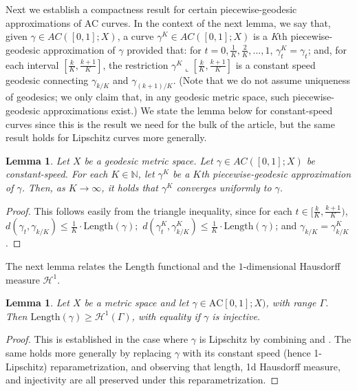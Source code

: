 \documentclass[aos, preprint]{imsart}
\theoremstyle{plain}
\newtheorem{lem}[theorem]{Lemma}
\theoremstyle{remark}
\begin{document}
\begin{appendix}
Next we establish a compactness result for certain piecewise-geodesic
approximations of AC curves. In the context of the next lemma, we say
that, given $\gamma\in AC([0,1];X)$, a curve $\gamma^{K}\in
AC([0,1];X)$ is a \emph{K}th piecewise-geodesic approximation of
$\gamma$ provided that: for $t=0, \frac{1}{K}, \frac{2}{K},...,1$,
$\gamma_{t}^{K}=\gamma_{t}$; and, for each interval $[\frac{k}{K},
\frac{k+1}{K}]$,  the restriction $\gamma^{K}\llcorner[ \frac{k}{K}, \frac{k+1}{K}]$
is
a constant speed geodesic connecting $\gamma_{k/K}$ and
$\gamma_{(k+1)/K}$. (Note that we do not assume uniqueness of
geodesics; we only claim that, in any geodesic metric space, such
piecewise-geodesic approximations exist.) We state the lemma below for
constant-speed curves since this is the result we need for the bulk of
the article, but
the same result holds for Lipschitz curves
more generally.
\begin{lem}
\label{lem:piecewise-geodesic}
Let $X$ be a geodesic metric space. Let $\gamma\in AC([0,1];X)$
be constant-speed. For each $K\in\mathbb{N}$, let $\gamma^{K}$ be
a $K$th piecewise-geodesic approximation of $\gamma$. Then, as $K\rightarrow\infty$,
it holds that $\gamma^{K}$ converges uniformly to $\gamma$.
\end{lem}

\begin{proof}
This follows easily from the triangle inequality, since
for each $t\in[ \frac{k}{K}, \frac{k+1}{K})$, $d(\gamma_{t},\gamma_{k/K}) \leq
      \frac{1}{K}\cdot\text{Length}(\gamma);$
$ d(\gamma_{t}^{K},\gamma_{k/K}^{K}) \le \frac{1}{K}\cdot \text{Length}(\gamma) $; and       $\gamma_{k/K}=\gamma_{k/K}^{K}$.
\end{proof}

The next lemma relates the Length functional and the $1$-dimensional Hausdorff measure  $\mathcal{H}^{1}$.
\begin{lem}
\label{lem:hausdorff equals length}
Let $X$ be a metric space and let $\gamma\in \text{AC}[0,1];X)$, with range $\Gamma$. Then $\text{Length}(\gamma)\geq\mathcal{H}^{1}(\Gamma)$,
with equality if $\gamma$ is injective.
\end{lem}
\begin{proof}
This is established in the case where $\gamma$ is Lipschitz by combining
\cite[Theorem 4.1.6]{ambrosio2004topics} and \cite[Theorem 4.4.2]{ambrosio2004topics}.
The same holds more generally by replacing $\gamma$ with its constant
speed (hence 1-Lipschitz) reparametrization, and observing that length,
1d Hausdorff measure, and injectivity are all preserved under this
reparametrization.
\end{proof}


\end{appendix}
\end{document}
